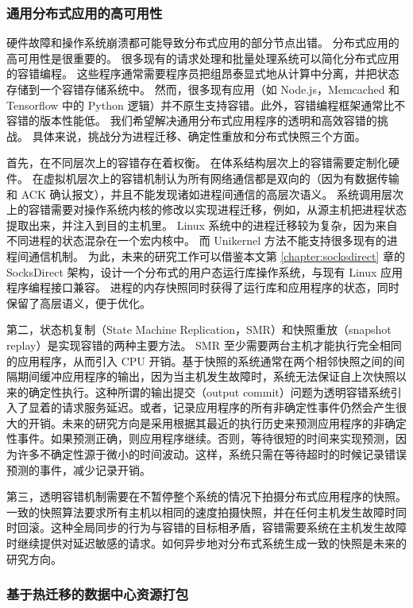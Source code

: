 \subsubsection{通用分布式应用的高可用性}
\label{future:ftlinux}

硬件故障和操作系统崩溃都可能导致分布式应用的部分节点出错。
分布式应用的高可用性是很重要的。
很多现有的请求处理和批量处理系统可以简化分布式应用的容错编程。
这些程序通常需要程序员把组昂泰显式地从计算中分离，并把状态存储到一个容错存储系统中。
然而，很多现有应用（如 Node.js，Memcached 和 Tensorflow 中的 Python 逻辑）并不原生支持容错。此外，容错编程框架通常比不容错的版本性能低。
我们希望解决通用分布式应用程序的透明和高效容错的挑战。
具体来说，挑战分为进程迁移、确定性重放和分布式快照三个方面。

首先，在不同层次上的容错存在着权衡。
在体系结构层次上的容错需要定制化硬件。
在虚拟机层次上的容错机制认为所有网络通信都是双向的（因为有数据传输和 ACK 确认报文），并且不能发现诸如进程间通信的高层次语义。
系统调用层次上的容错需要对操作系统内核的修改以实现进程迁移，例如，从源主机把进程状态提取出来，并注入到目的主机里。
Linux 系统中的进程迁移较为复杂，因为来自不同进程的状态混杂在一个宏内核中。
而 Unikernel 方法不能支持很多现有的进程间通信机制。
为此，未来的研究工作可以借鉴本文第 \ref{chapter:socksdirect} 章的 SocksDirect 架构，设计一个分布式的用户态运行库操作系统，与现有 Linux 应用程序编程接口兼容。
进程的内存快照同时获得了运行库和应用程序的状态，同时保留了高层语义，便于优化。

第二，状态机复制（State Machine Replication，SMR）和快照重放（snapshot replay）是实现容错的两种主要方法。 SMR 至少需要两台主机才能执行完全相同的应用程序，从而引入 CPU 开销。基于快照的系统通常在两个相邻快照之间的间隔期间缓冲应用程序的输出，因为当主机发生故障时，系统无法保证自上次快照以来的确定性执行。这种所谓的输出提交（output commit）问题为透明容错系统引入了显着的请求服务延迟。或者，记录应用程序的所有非确定性事件仍然会产生很大的开销。未来的研究方向是采用根据其最近的执行历史来预测应用程序的非确定性事件。如果预测正确，则应用程序继续。否则，等待很短的时间来实现预测，因为许多不确定性源于微小的时间波动。这样，系统只需在等待超时的时候记录错误预测的事件，减少记录开销。

第三，透明容错机制需要在不暂停整个系统的情况下拍摄分布式应用程序的快照。一致的快照算法要求所有主机以相同的速度拍摄快照，并在任何主机发生故障时同时回滚。这种全局同步的行为与容错的目标相矛盾，容错需要系统在主机发生故障时继续提供对延迟敏感的请求。如何异步地对分布式系统生成一致的快照是未来的研究方向。


\subsubsection{基于热迁移的数据中心资源打包}
\label{future:resource-packing}

